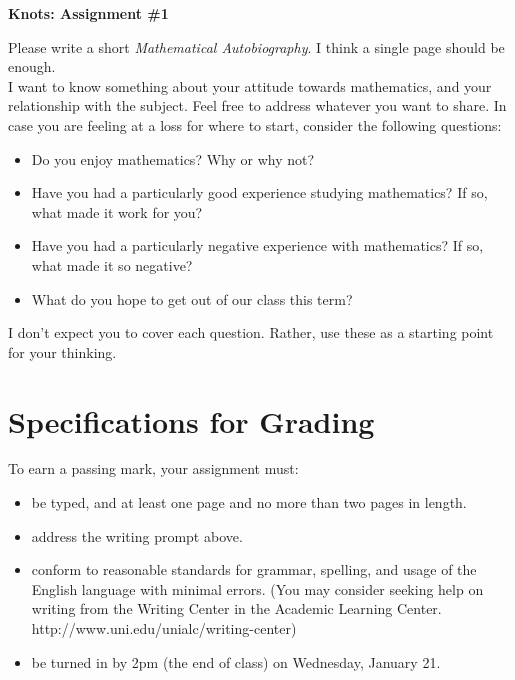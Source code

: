 \documentclass[12pt,letterpaper]{article}
\begin{document}
\setlength{\parskip}{1ex plus 0.5ex minus 0.2ex}
\setlength{\parindent}{0pt}

\pagestyle{fancy}
\lfoot{} 
\rfoot{} 

\begin{center}
{
\Large
\textbf{Knots: Assignment \#1}
}
\end{center}

Please write a short \emph{Mathematical Autobiography}.
I think a single page should be enough.\\

I want to know something about your attitude towards mathematics, and your relationship with the subject.
Feel free to address whatever you want to share.
In case you are feeling at a loss for where to start, consider the following questions:
\begin{itemize}
\item Do you enjoy mathematics? Why or why not?
\item Have you had a particularly good experience studying mathematics?
If so, what made it work for you?
\item Have you had a particularly negative experience with mathematics?
If so, what made it so negative?
\item What do you hope to get out of our class this term?
\end{itemize}
I don't expect you to cover each question. Rather, use these as a starting point for your thinking.\\[.25in]


\section*{Specifications for Grading}

To earn a passing mark, your assignment must:
\begin{itemize}
\item be typed, and at least one page and no more than two pages in length.
\item address the writing prompt above.
\item conform to reasonable standards for grammar, spelling, and usage of the English language with minimal errors. (You may consider seeking help on writing from the Writing Center in the Academic Learning Center. http://www.uni.edu/unialc/writing-center)
\item be turned in by 2pm (the end of class) on Wednesday, January 21.
\end{itemize}
\end{document}
